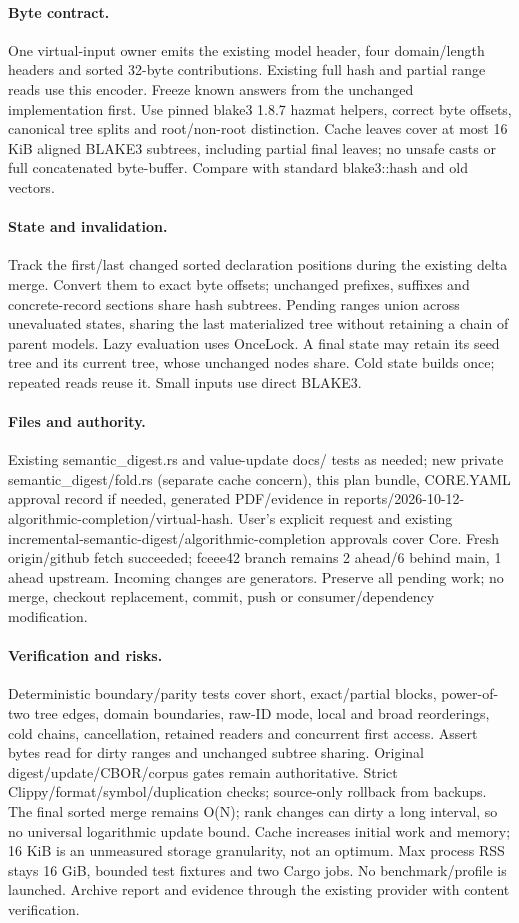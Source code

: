 \documentclass[11pt,a4paper]{article}
\begin{document}
\paragraph{Byte contract.} One virtual-input owner emits the existing model header,
four domain/length headers and sorted 32-byte contributions. Existing full hash
and partial range reads use this encoder. Freeze known answers from the unchanged
implementation first. Use pinned blake3 1.8.7 hazmat helpers, correct byte offsets,
canonical tree splits and root/non-root distinction. Cache leaves cover at most
16 KiB aligned BLAKE3 subtrees, including partial final leaves; no unsafe casts or
full concatenated byte-buffer. Compare with standard blake3::hash and old vectors.
\paragraph{State and invalidation.} Track the first/last changed sorted declaration
positions during the existing delta merge. Convert them to exact byte offsets;
unchanged prefixes, suffixes and concrete-record sections share hash subtrees.
Pending ranges union across unevaluated states, sharing the last materialized tree
without retaining a chain of parent models. Lazy evaluation uses OnceLock. A final
state may retain its seed tree and its current tree, whose unchanged nodes share.
Cold state builds once; repeated reads reuse it. Small inputs use direct BLAKE3.
\paragraph{Files and authority.} Existing semantic\_digest.rs and value-update docs/
tests as needed; new private semantic\_digest/fold.rs (separate cache concern),
this plan bundle, CORE.YAML approval record if needed, generated PDF/evidence in
reports/2026-10-12-algorithmic-completion/virtual-hash. User's explicit request and
existing incremental-semantic-digest/algorithmic-completion approvals cover Core.
Fresh origin/github fetch succeeded; fceee42 branch remains 2 ahead/6 behind main,
1 ahead upstream. Incoming changes are generators. Preserve all pending work;
no merge, checkout replacement, commit, push or consumer/dependency modification.
\paragraph{Verification and risks.} Deterministic boundary/parity tests cover
short, exact/partial blocks, power-of-two tree edges, domain boundaries, raw-ID
mode, local and broad reorderings, cold chains, cancellation, retained readers
and concurrent first access. Assert bytes read for dirty ranges and unchanged
subtree sharing. Original digest/update/CBOR/corpus gates remain authoritative.
Strict Clippy/format/symbol/duplication checks; source-only rollback from backups.
The final sorted merge remains O(N); rank changes can dirty a long interval, so
no universal logarithmic update bound. Cache increases initial work and memory;
16 KiB is an unmeasured storage granularity, not an optimum. Max process RSS stays
16 GiB, bounded test fixtures and two Cargo jobs. No benchmark/profile is launched.
Archive report and evidence through the existing provider with content verification.
\end{document}
